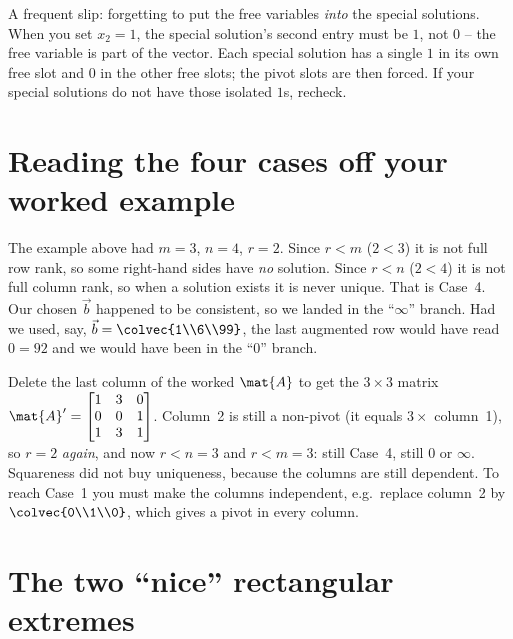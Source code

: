 \begin{trapbox}
A frequent slip: forgetting to put the free variables \emph{into} the special solutions.
When you set $x_2=1$, the special solution's second entry must be $1$, not $0$ -- the free
variable is part of the vector. Each special solution has a single $1$ in its own free slot
and $0$ in the other free slots; the pivot slots are then forced. If your special solutions
do not have those isolated $1$s, recheck.
\end{trapbox}

\section{Reading the four cases off your worked example}

The example above had $m=3$, $n=4$, $r=2$. Since $r<m$ ($2<3$) it is not full row rank, so
some right-hand sides have \emph{no} solution. Since $r<n$ ($2<4$) it is not full column
rank, so when a solution exists it is never unique. That is Case~4. Our chosen $\vec{b}$
happened to be consistent, so we landed in the ``$\infty$'' branch. Had we used, say,
$\vec{b}=\colvec{1\\6\\99}$, the last augmented row would have read $0=92$ and we would
have been in the ``$0$'' branch.

\begin{example}
\label{ch13:flip}
Delete the last column of the worked $\mat{A}$ to get the $3\times3$ matrix
$\mat{A}'=\begin{bmatrix}1&3&0\\0&0&1\\1&3&1\end{bmatrix}$. Column~2 is still a non-pivot
(it equals $3\times$ column~1), so $r=2$ \emph{again}, and now $r<n=3$ and $r<m=3$: still
Case~4, still $0$ or $\infty$. Squareness did not buy uniqueness, because the columns are
still dependent. To reach Case~1 you must make the columns independent, e.g.\ replace
column~2 by $\colvec{0\\1\\0}$, which gives a pivot in every column.
\end{example}

\section{The two ``nice'' rectangular extremes}

